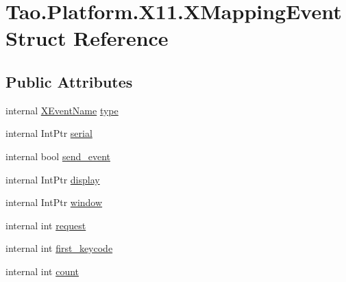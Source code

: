 \hypertarget{struct_tao_1_1_platform_1_1_x11_1_1_x_mapping_event}{
\section{Tao.Platform.X11.XMappingEvent Struct Reference}
\label{struct_tao_1_1_platform_1_1_x11_1_1_x_mapping_event}
}
\subsection*{Public Attributes}
\begin{DoxyCompactItemize}
\item 
internal \hyperlink{namespace_tao_1_1_platform_1_1_x11_aff81ed5b8778e1ea8e872861dff9f146}{XEventName} \hyperlink{struct_tao_1_1_platform_1_1_x11_1_1_x_mapping_event_a7693e284d5f23ab8d6e9a2b801f0e367}{type}
\item 
internal IntPtr \hyperlink{struct_tao_1_1_platform_1_1_x11_1_1_x_mapping_event_a8bcd76f5520f6a4f84da069b19440e35}{serial}
\item 
internal bool \hyperlink{struct_tao_1_1_platform_1_1_x11_1_1_x_mapping_event_aca3196b128d3235b6e773f61b32cf203}{send\_\-event}
\item 
internal IntPtr \hyperlink{struct_tao_1_1_platform_1_1_x11_1_1_x_mapping_event_a39737195cb47dc20ab5506c1efd65a7a}{display}
\item 
internal IntPtr \hyperlink{struct_tao_1_1_platform_1_1_x11_1_1_x_mapping_event_a2c678d84add70739544d45f7e1d05aaf}{window}
\item 
internal int \hyperlink{struct_tao_1_1_platform_1_1_x11_1_1_x_mapping_event_a014624007bbaf17cf3985f97497f6c79}{request}
\item 
internal int \hyperlink{struct_tao_1_1_platform_1_1_x11_1_1_x_mapping_event_ac6e16163779f837bc0e2f65c0179d93b}{first\_\-keycode}
\item 
internal int \hyperlink{struct_tao_1_1_platform_1_1_x11_1_1_x_mapping_event_a10e83424aee6bf9121696063b0171122}{count}
\end{DoxyCompactItemize}



